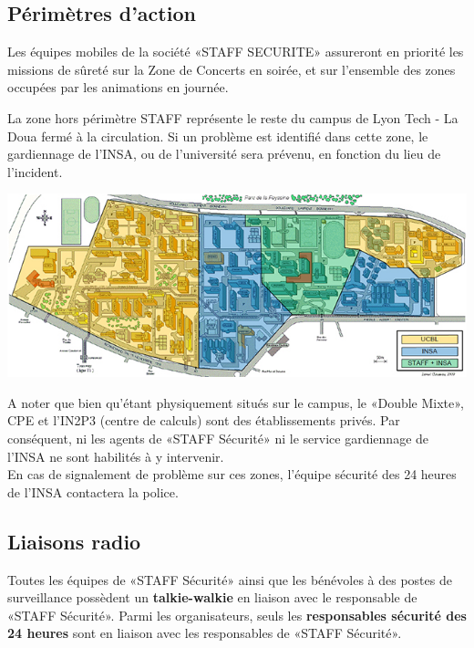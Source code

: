 \documentclass[hidelinks, paper=a4, fontsize=13pt]{report}
\begin{document}
\subsection{Périmètres d’action}

Les équipes mobiles de la société «STAFF SECURITE» assureront en priorité les missions de sûreté sur la Zone de Concerts en soirée, et sur l’ensemble des zones occupées par les animations en journée. 

La zone hors périmètre STAFF représente le reste du campus de Lyon Tech - La Doua fermé à la circulation. Si un problème est identifié dans cette zone, le gardiennage de l’INSA, ou de l’université sera prévenu, en fonction du lieu de l’incident.

\begin{center}
	\includegraphics[scale=0.8]{Annexes/Plans/perimetreSecu}
\end{center}


A noter que bien qu’étant physiquement situés sur le campus, le «Double Mixte», CPE et l’IN2P3 (centre de calculs) sont des établissements privés. Par conséquent, ni les agents de «STAFF Sécurité» ni le service gardiennage de l’INSA ne sont habilités à y intervenir. \\

En cas de signalement de  problème sur ces zones, l’équipe sécurité des 24 heures de l'INSA contactera la police.

\subsection{Liaisons radio}

Toutes les équipes de «STAFF Sécurité» ainsi que les bénévoles à des postes de surveillance possèdent un \textbf{talkie-walkie} en liaison avec le responsable de «STAFF Sécurité». Parmi les organisateurs, seuls les \textbf{responsables sécurité des 24 heures} sont en liaison avec les responsables de «STAFF Sécurité».\\
\end{document}
